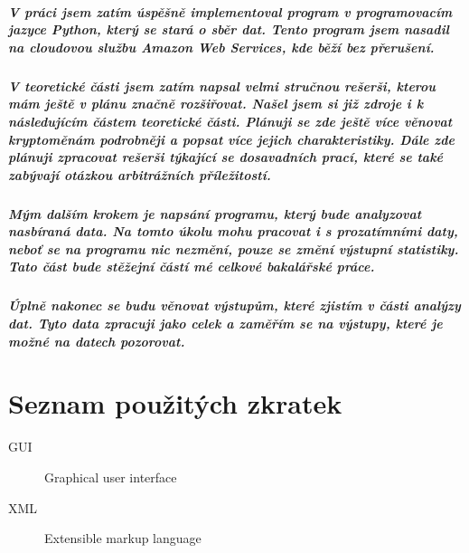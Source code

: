 \documentclass[thesis=B,czech]{FITthesis}[2019/03/21]
\begin{document}
\begin{conclusion}
\paragraph{
V práci jsem zatím úspěšně implementoval program v programovacím jazyce Python, který se stará o sběr dat. Tento program jsem nasadil na cloudovou službu Amazon Web Services, kde běží bez přerušení. 
}
\paragraph{
V teoretické části jsem zatím napsal velmi stručnou rešerši, kterou mám ještě v plánu značně rozšiřovat. Našel jsem si již zdroje i k následujícím částem teoretické části.  Plánuji se zde ještě více věnovat kryptoměnám podrobněji a popsat více jejich charakteristiky. Dále zde plánuji zpracovat rešerši týkající se dosavadních prací, které se také zabývají otázkou arbitrážních příležitostí.
}
\paragraph{
Mým dalším krokem je napsání programu, který bude analyzovat nasbíraná data. Na tomto úkolu mohu pracovat i s prozatímními daty, neboť se na programu nic nezmění, pouze se změní výstupní statistiky. Tato část bude stěžejní částí mé celkové bakalářské práce.
}
\paragraph{
Úplně nakonec se budu věnovat výstupům, které zjistím v části analýzy dat. Tyto data zpracuji jako celek a zaměřím se na výstupy, které je možné na datech pozorovat.
}

\end{conclusion}




\appendix

\chapter{Seznam použitých zkratek}
\begin{description}
	\item[GUI] Graphical user interface
	\item[XML] Extensible markup language
\end{description}
\end{document}
